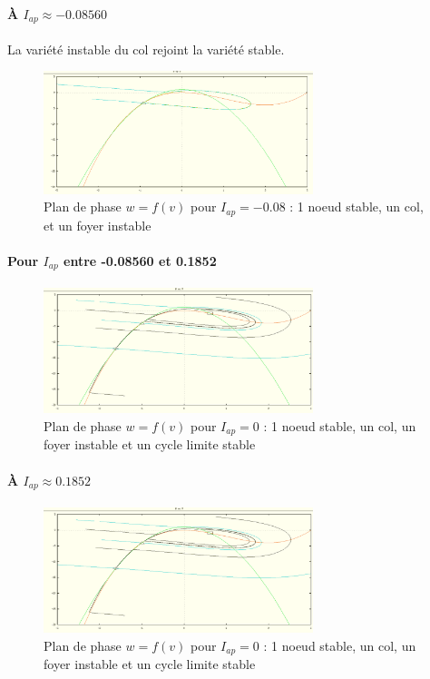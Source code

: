 \documentclass[12pt,a4paper,onecolumn]{article}
\begin{document}
\paragraph{À $I_{ap} \approx -0.08560$}
La variété instable du col rejoint la variété stable.
\begin{figure}[H]
	\begin{center}
	\includegraphics[width = 0.7\textwidth]{I-0_08.png}
	\end{center}
\caption{Plan de phase $w=f(v)$ pour $I_{ap} = -0.08$ : 1 noeud stable, un col, et un foyer instable}
\end{figure}

\paragraph{Pour $I_{ap}$ entre -0.08560 et 0.1852}
\begin{figure}[H]
	\begin{center}
	\includegraphics[width = 0.7\textwidth]{I0.png}
	\end{center}
\caption{Plan de phase $w=f(v)$ pour $I_{ap} = 0$ : 1 noeud stable, un col, un foyer instable et un cycle limite stable}
\end{figure}

\paragraph{À $I_{ap} \approx 0.1852$}
\begin{figure}[H]
	\begin{center}
	\includegraphics[width = 0.7\textwidth]{I0.png}
	\end{center}
\caption{Plan de phase $w=f(v)$ pour $I_{ap} = 0$ : 1 noeud stable, un col, un foyer instable et un cycle limite stable}
\end{figure}
\end{document}
